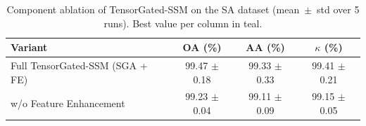 \begin{table}[htbp]
  \centering
  \caption{Component ablation of TensorGated-SSM on the SA dataset (mean~$\pm$~std over 5 runs). Best value per column in \textcolor{tgteal}{teal}.}
  \label{tab:ablation_sa}
  \begin{tabular}{l c c c}
    \toprule
    Variant & OA (\%) & AA (\%) & $\kappa$ (\%) \\
    \midrule
    Full TensorGated-SSM (SGA + FE) & \textcolor{tgteal}{99.47 $\pm$ 0.18} & \textcolor{tgteal}{99.33 $\pm$ 0.33} & \textcolor{tgteal}{99.41 $\pm$ 0.21} \\
    w/o Feature Enhancement & 99.23 $\pm$ 0.04 & 99.11 $\pm$ 0.09 & 99.15 $\pm$ 0.05 \\
    \bottomrule
  \end{tabular}
\end{table}
